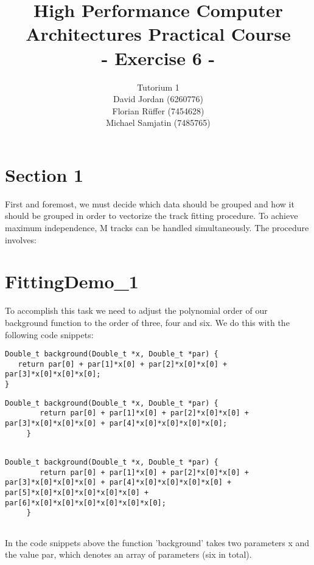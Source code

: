\documentclass{article}
\title{\textbf{High Performance Computer Architectures Practical Course \\ - Exercise 6 -} \\[10mm]}
\author{Tutorium 1 \\[10mm] David Jordan (6260776) \\[1mm] Florian Rüffer (7454628) \\[1mm] Michael Samjatin (7485765) \\[10mm]}
\begin{document}
\maketitle
\newpage
\section*{Section 1}

First and foremost, we must decide which data should be
grouped and how it should be grouped in order to vectorize
the track fitting procedure.
To achieve maximum independence, M tracks can be handled simultaneously.
The procedure involves:

\section*{FittingDemo\_1}
To accomplish this task we need to adjust the polynomial order of our background function
to the order of three, four and six. We do this with the following code snippets: \\[3mm]

\begin{lstlisting}[caption=Order 3]
    Double_t background(Double_t *x, Double_t *par) {
   return par[0] + par[1]*x[0] + par[2]*x[0]*x[0] + par[3]*x[0]*x[0]*x[0];
}

\end{lstlisting}
\begin{lstlisting}[caption=Order 4]
    Double_t background(Double_t *x, Double_t *par) {
        return par[0] + par[1]*x[0] + par[2]*x[0]*x[0] + par[3]*x[0]*x[0]*x[0] + par[4]*x[0]*x[0]*x[0]*x[0];
     }
     
\end{lstlisting}
\begin{lstlisting}[caption=Order 6]
    Double_t background(Double_t *x, Double_t *par) {
        return par[0] + par[1]*x[0] + par[2]*x[0]*x[0] + par[3]*x[0]*x[0]*x[0] + par[4]*x[0]*x[0]*x[0]*x[0] + par[5]*x[0]*x[0]*x[0]*x[0]*x[0] + par[6]*x[0]*x[0]*x[0]*x[0]*x[0]*x[0];
     }
     

\end{lstlisting}

In the code snippets above the function 'background' takes two parameters x and the value par, which denotes
an array of parameters (six in total).

  
\end{document}
